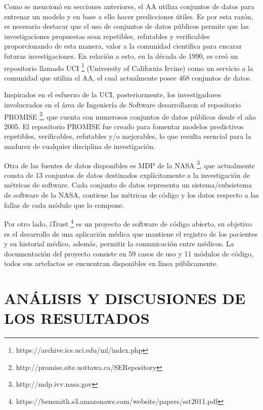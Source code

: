 \documentclass[journal]{IEEEtran}
\begin{document}
Como se mencionó en secciones anteriores, el AA utiliza conjuntos de datos para entrenar un modelo y en base a ello hacer predicciones útiles. Es por esta razón, es necesario destacar que el uso de conjuntos de datos públicos permite que las investigaciones propuestas sean repetibles, refutables y verificables \cite{Catal2009} proporcionando de esta manera, valor a la comunidad científica para encarar futuras investigaciones. En relación a esto, en la década de 1990, se creó un repositorio llamado UCI \footnote{https://archive.ics.uci.edu/ml/index.php} (University of California Irvine) como un servicio a la comunidad que utiliza el AA, el cual actualmente posee 468 conjuntos de datos. 

Inspirados en el esfuerzo de la UCI, posteriormente, los investigadores involucrados en el área de Ingeniería de Software desarrollaron el repositorio PROMISE \footnote{http://promise.site.uottawa.ca/SERepository}, que cuenta con numerosos conjuntos de datos públicos desde el año 2005. El repositorio PROMISE fue creado para fomentar modelos predictivos repetibles, verificables, refutables y/o mejorables, lo que resulta esencial para la madurez de cualquier disciplina de investigación. 

Otra de las fuentes de datos disponibles es MDP de la NASA \footnote{http://mdp.ivv.nasa.gov}, que actualmente consta de 13 conjuntos de datos destinados explícitamente a la investigación de métricas de software. Cada conjunto de datos representa un sistema/subsistema de software de la NASA, contiene las métricas de código y los datos respecto a las fallas de cada módulo que lo compone.

Por otro lado, iTrust \footnote{https://bensmith.s3.amazonaws.com/website/papers/sst2011.pdf} es un proyecto de software de código abierto, su objetivo es el desarrollo de una aplicación médica que mantiene el registro de los pacientes y su historial médico, además, permitir la comunicación entre médicos. La documentación del proyecto consiste en 59 casos de uso y 11 módulos de código, todos sus artefactos se encuentran disponibles en línea públicamente. 

\section{ANÁLISIS Y DISCUSIONES DE LOS RESULTADOS}
\end{document}
